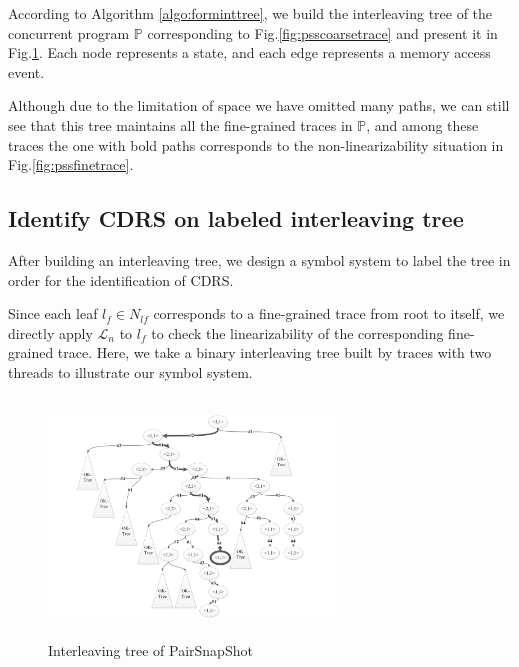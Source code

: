 \documentclass[runningheads]{llncs}
\begin{document}
\begin{example} 
According to Algorithm \ref{algo:forminttree}, we build the interleaving tree of the concurrent program $\mathbb{P}$ corresponding to Fig.\ref{fig:psscoarsetrace} and present it in Fig.\ref{fig:interleavingtreeofpairsnapshot}. Each node represents a state, and each edge represents a memory access event.

Although due to the limitation of space we have omitted many paths, we can still see that this tree maintains all the fine-grained traces in $\mathbb{P}$, and among these traces the one with bold paths corresponds to 
the non-linearizability situation in Fig.\ref{fig:pssfinetrace}.
\end{example}






\subsection{Identify CDRS on labeled interleaving tree}\label{sec:identifycdrs}
After building an interleaving tree, we design a symbol system to label the tree in order for the identification of CDRS.



Since each leaf $l_f\in N_{lf}$ corresponds to a fine-grained trace from root to itself, we directly apply $\mathcal{L}_n$ to $l_f$ to check the linearizability of the corresponding fine-grained trace. Here, we take a binary interleaving tree built by traces with two threads to illustrate our symbol system.

\begin{figure}
\centering
\includegraphics[height = 2.5in, width = 3in]{pssinttree.pdf}
\caption{Interleaving tree of PairSnapShot}\label{fig:interleavingtreeofpairsnapshot}
\end{figure}
\end{document}
